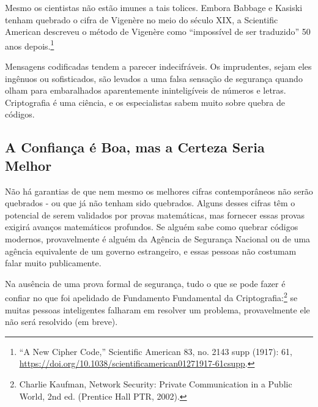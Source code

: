 \documentclass{book}
\begin{document}
Mesmo os cientistas não estão imunes a tais tolices. Embora Babbage e Kasiski tenham quebrado o cifra de Vigenère no meio do século XIX, a Scientific American descreveu o método de Vigenère como ``impossível de ser traduzido'' 50 anos depois.\footnote{“A New Cipher Code,” Scientific American 83, no. 2143 supp (1917): 61, \url{https://doi.org/10.1038/scientificamerican01271917‐61csupp}.}

Mensagens codificadas tendem a parecer indecifráveis. Os imprudentes, sejam eles ingênuos ou sofisticados, são levados a uma falsa sensação de segurança quando olham para embaralhados aparentemente ininteligíveis de números e letras. Criptografia é uma ciência, e os especialistas sabem muito sobre quebra de códigos.


\subsection{A Confiança é Boa, mas a Certeza Seria Melhor}
\label{segredos:confianca}

Não há garantias de que nem mesmo os melhores cifras contemporâneos não serão quebrados - ou que já não tenham sido quebrados. Alguns desses cifras têm o potencial de serem validados por provas matemáticas, mas fornecer essas provas exigirá avanços matemáticos profundos. Se alguém sabe como quebrar códigos modernos, provavelmente é alguém da Agência de Segurança Nacional ou de uma agência equivalente de um governo estrangeiro, e essas pessoas não costumam falar muito publicamente.

Na ausência de uma prova formal de segurança, tudo o que se pode fazer é confiar no que foi apelidado de Fundamento Fundamental da Criptografia:\footnote{Charlie Kaufman, Network Security: Private Communication in a Public World, 2nd ed. (Prentice Hall PTR, 2002).} se muitas pessoas inteligentes falharam em resolver um problema, provavelmente ele não será resolvido (em breve).
\end{document}
